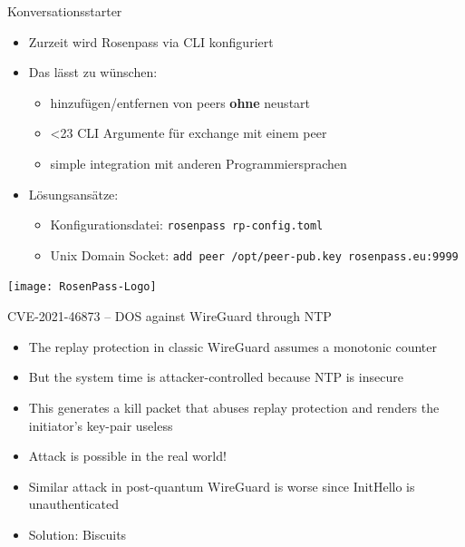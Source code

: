 \documentclass{rosenpass-beamer}
\begin{document}
\begin{frame}{Konversationsstarter}

\begin{itemize}
\item
  Zurzeit wird Rosenpass via CLI konfiguriert
\item
  Das lässt zu wünschen:
  \begin{itemize}
  \item
    hinzufügen/entfernen von peers \textbf{ohne} neustart
  \item\relax
    <23 CLI Argumente für exchange mit einem peer
  \item
    simple integration mit anderen Programmiersprachen
  \end{itemize}
\item
  Lösungsansätze:
  \begin{itemize}
  \item
    Konfigurationsdatei: \texttt{rosenpass\ rp-config.toml}
  \item
    Unix Domain Socket:
    \texttt{add\ peer\ /opt/peer-pub.key\ rosenpass.eu:9999}
  \end{itemize}
\end{itemize}
\end{frame}




\appendix

\begin{frame}
\centering
\texttt{[image: RosenPass-Logo]}\end{frame}


\begin{frame}{CVE-2021-46873 – DOS against WireGuard through NTP}
\begin{itemize}
  \item The replay protection in classic WireGuard assumes a monotonic counter
  \item But the system time is attacker-controlled because NTP is insecure
  \item This generates a kill packet that abuses replay protection and renders the initiator's key-pair useless
  \item Attack is possible in the real world!
  \item Similar attack in post-quantum WireGuard is worse since InitHello is unauthenticated
  \item Solution: Biscuits
\end{itemize}
\end{frame}
\end{document}
